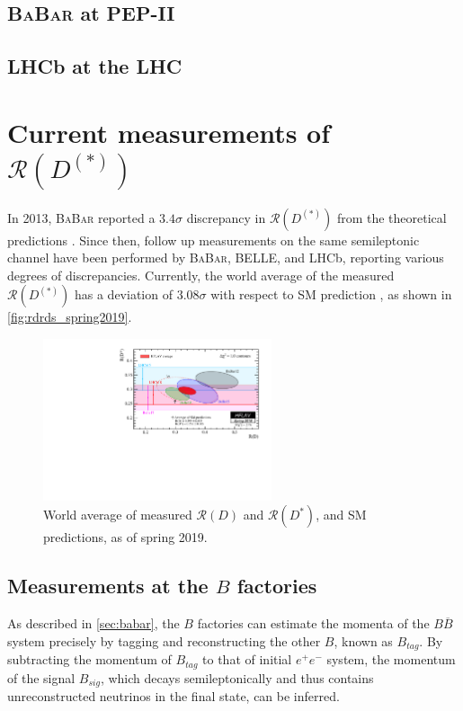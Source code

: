 \documentclass[12pt,letterpaper]{article}
\def\BaBar/{\textsc{BaBar}}
\def\RD/{\ensuremath{\mathcal{R}(D)}}
\def\RDst/{\ensuremath{\mathcal{R}(D^{*})}}
\def\RDDst/{\ensuremath{\mathcal{R}(D^{(*)})}}
\begin{document}
\subsection{\BaBar/ at PEP-II} \label{sec:babar}


\subsection{LHCb at the LHC} \label{sec:lhcb}


\section{Current measurements of \RDDst/}
In 2013, \BaBar/ reported a $3.4\sigma$ discrepancy in \RDDst/ from the
theoretical predictions \cite{Lees:2013rw}.
Since then, follow up measurements on the same semileptonic channel have been
performed by \BaBar/, BELLE, and LHCb, reporting various degrees of
discrepancies.
Currently, the world average of the measured \RDDst/ has a deviation of
$3.08\sigma$ with respect to SM prediction \cite{HFLAV:2019}, as shown
in \autoref{fig:rdrds_spring2019}.

\begin{figure}[ht]
    \centering
    \includegraphics[width=0.6\textwidth]{figs/rdrds_spring2019.pdf}
    \caption{
        World average of measured \RD/ and \RDst/, and SM predictions, as of
        spring 2019.
    }
    \label{fig:rdrds_spring2019}
\end{figure}

\subsection{Measurements at the $B$ factories} \label{sec:meas_bfactories}
As described in \autoref{sec:babar}, the $B$ factories
can estimate the momenta of the $B \overline{B}$ system precisely by tagging and reconstructing the other $B$, known as $B_{tag}$. By subtracting the momentum
of $B_{tag}$ to that of initial $e^+e^-$ system, the momentum of
the signal $B_{sig}$, which decays semileptonically and thus contains unreconstructed
neutrinos in the final state, can be inferred.
\end{document}
